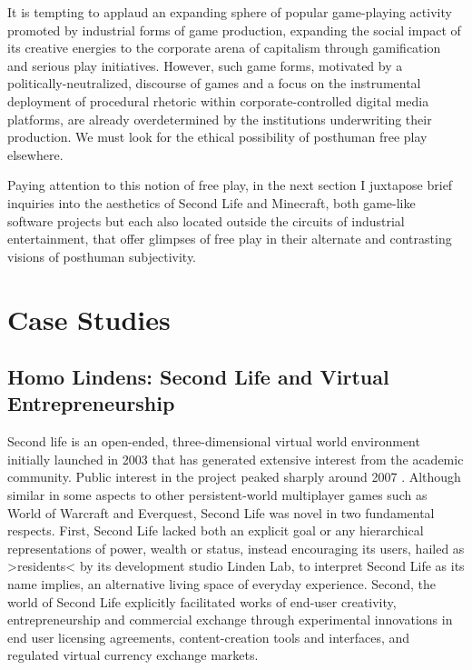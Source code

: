 It is tempting to applaud an expanding sphere of popular game-playing activity promoted by industrial forms of game production, expanding the social impact of its creative energies to the corporate arena of capitalism through gamification and serious play initiatives. However, such game forms, motivated by a politically-neutralized, discourse of games and a focus on the instrumental deployment of procedural rhetoric within corporate-controlled digital media platforms, are already overdetermined by the institutions underwriting their production. We must look for the ethical possibility of posthuman free play elsewhere.

Paying attention to this notion of free play, in the next section I juxtapose brief inquiries into the aesthetics of Second Life and Minecraft, both game-like software projects but each also located outside the circuits of industrial entertainment, that offer glimpses of free play in their alternate and contrasting visions of posthuman subjectivity.

\section{Case Studies}
\subsection*{Homo Lindens: Second Life and Virtual Entrepreneurship}
Second life is an open-ended, three-dimensional virtual world environment initially launched in 2003 that has generated extensive interest from the academic community. Public interest in the project peaked sharply around 2007 \autocite{Google-sl}.
Although similar in some aspects to other persistent-world multiplayer games such as World of Warcraft and Everquest, Second Life was novel in two fundamental respects. First, Second Life lacked both an explicit goal or any hierarchical representations of power, wealth or status, instead encouraging its users, hailed as >residents< by its development studio Linden Lab, to interpret Second Life as its name implies, an alternative living space of everyday experience. Second, the world of Second Life explicitly facilitated works of end-user creativity, entrepreneurship and commercial exchange through experimental innovations in end user licensing agreements, content-creation tools and interfaces, and regulated virtual currency exchange markets.

